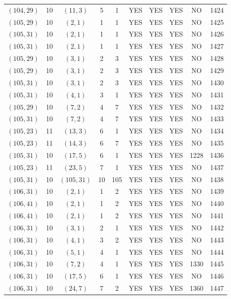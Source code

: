 \begin{longtable}{|c|c|c|c|c|c|c|c|c|c|}
$(104, 29)$ & 10 & $(11, 3)$ & 5 & 1 & YES & YES & YES & NO & 1424\\
$(105, 29)$ & 10 & $(2, 1)$ & 1 & 1 & YES & YES & YES & NO & 1425\\
$(105, 31)$ & 10 & $(2, 1)$ & 1 & 1 & YES & YES & YES & NO & 1426\\
$(105, 31)$ & 10 & $(2, 1)$ & 1 & 1 & YES & YES & YES & NO & 1427\\
$(105, 29)$ & 10 & $(3, 1)$ & 2 & 3 & YES & YES & YES & NO & 1428\\
$(105, 29)$ & 10 & $(3, 1)$ & 2 & 3 & YES & YES & YES & NO & 1429\\
$(105, 31)$ & 10 & $(3, 1)$ & 2 & 3 & YES & YES & YES & NO & 1430\\
$(105, 31)$ & 10 & $(4, 1)$ & 3 & 1 & YES & YES & YES & NO & 1431\\
$(105, 29)$ & 10 & $(7, 2)$ & 4 & 7 & YES & YES & YES & NO & 1432\\
$(105, 31)$ & 10 & $(7, 2)$ & 4 & 7 & YES & YES & YES & NO & 1433\\
$(105, 23)$ & 11 & $(13, 3)$ & 6 & 1 & YES & YES & YES & NO & 1434\\
$(105, 23)$ & 11 & $(14, 3)$ & 6 & 7 & YES & YES & YES & NO & 1435\\
$(105, 31)$ & 10 & $(17, 5)$ & 6 & 1 & YES & YES & YES & 1228 & 1436\\
$(105, 23)$ & 11 & $(23, 5)$ & 7 & 1 & YES & YES & YES & NO & 1437\\
$(105, 31)$ & 10 & $(105, 31)$ & 10 & 105 & YES & YES & YES & NO & 1438\\
$(106, 31)$ & 10 & $(2, 1)$ & 1 & 2 & YES & YES & YES & NO & 1439\\
$(106, 41)$ & 10 & $(2, 1)$ & 1 & 2 & YES & YES & YES & NO & 1440\\
$(106, 41)$ & 10 & $(2, 1)$ & 1 & 2 & YES & YES & YES & NO & 1441\\
$(106, 31)$ & 10 & $(3, 1)$ & 2 & 1 & YES & YES & YES & NO & 1442\\
$(106, 31)$ & 10 & $(4, 1)$ & 3 & 2 & YES & YES & YES & NO & 1443\\
$(106, 31)$ & 10 & $(5, 1)$ & 4 & 1 & YES & YES & YES & NO & 1444\\
$(106, 31)$ & 10 & $(7, 2)$ & 4 & 1 & YES & YES & YES & 1330 & 1445\\
$(106, 31)$ & 10 & $(17, 5)$ & 6 & 1 & YES & YES & YES & NO & 1446\\
$(106, 31)$ & 10 & $(24, 7)$ & 7 & 2 & YES & YES & YES & 1360 & 1447\\

\end{longtable}

